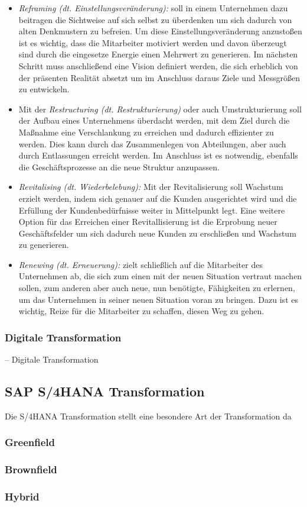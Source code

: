 \begin{itemize}
    \item[] \emph{Reframing (dt. Einstellungsveränderung):} soll in einem Unternehmen dazu beitragen die Sichtweise auf sich selbst zu überdenken um sich dadurch von alten Denkmustern zu befreien. Um diese Einstellungsveränderung anzustoßen ist es wichtig, dass die Mitarbeiter motiviert werden und davon überzeugt sind durch die eingesetze Energie einen Mehrwert zu generieren. Im nächsten Schritt muss anschließend eine Vision definiert werden, die sich erheblich von der präsenten Realität absetzt um im Anschluss daraus Ziele und Messgrößen zu entwickeln. 
    \item[] Mit der \emph{Restructuring (dt. Restrukturierung)} oder auch Umstrukturierung soll der Aufbau eines Unternehmens überdacht werden, mit dem Ziel durch die Maßnahme eine Verschlankung zu erreichen und dadurch effizienter zu werden. Dies kann durch das Zusammenlegen von Abteilungen, aber auch durch Entlassungen erreicht werden. Im Anschluss ist es notwendig, ebenfalls die Geschäftsprozesse an die neue Struktur anzupassen.   
    \item[] \emph{Revitalising (dt. Wiederbelebung):} Mit der Revitalisierung soll Wachstum erzielt werden, indem sich genauer auf die Kunden ausgerichtet wird und die Erfüllung der Kundenbedürfnisse weiter in Mittelpunkt legt. Eine weitere Option für das Erreichen einer Revitallisierung ist die Erprobung neuer Geschäftsfelder um sich dadurch neue Kunden zu erschließen und Wachstum zu generieren.
    \item[] \emph{Renewing (dt. Erneuerung):} zielt schließlich auf die Mitarbeiter des Unternehmen ab, die sich zum einen mit der neuen Situation vertraut machen sollen, zum anderen aber auch neue, nun benötigte, Fähigkeiten zu erlernen, um das Unternehmen in seiner neuen Situation voran zu bringen. Dazu ist es wichtig, Reize für die Mitarbeiter zu schaffen, diesen Weg zu gehen.
\end{itemize}

\subsubsection{Digitale Transformation}
-- Digitale Transformation

\subsection{SAP S/4HANA Transformation}
Die S/4HANA Transformation stellt eine besondere Art der Transformation da

\subsubsection{Greenfield}
\subsubsection{Brownfield}
\subsubsection{Hybrid}

